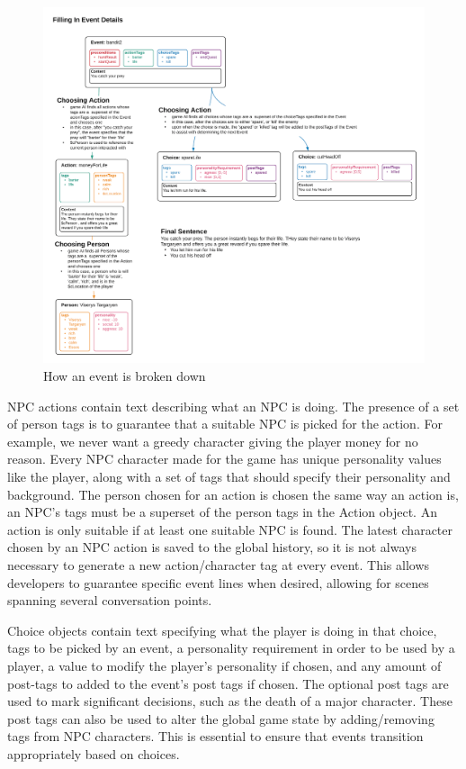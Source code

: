 \begin{figure}[ht]
    \centering
    \includegraphics[width=\textwidth]{images/eventFill.png}
    \caption{How an event is broken down}
    \label{fig:eventFill}
\end{figure}

NPC actions contain text describing what an NPC is doing. The presence of a set of person tags is to guarantee that a suitable NPC is picked for the action. For example, we never want a greedy character giving the player money for no reason. Every NPC character made for the game has unique personality values like the player, along with a set of tags that should specify their personality and background. The person chosen for an action is chosen the same way an action is, an NPC's tags must be a superset of the person tags in the Action object. An action is only suitable if at least one suitable NPC is found. The latest character chosen by an NPC action is saved to the global history, so it is not always necessary to generate a new action/character tag at every event. This allows developers to guarantee specific event lines when desired, allowing for scenes spanning several conversation points.

Choice objects contain text specifying what the player is doing in that choice, tags to be picked by an event, a personality requirement in order to be used by a player, a value to modify the player's personality if chosen, and any amount of post-tags to added to the event's post tags if chosen. The optional post tags are used to mark significant decisions, such as the death of a major character. These post tags can also be used to alter the global game state by adding/removing tags from NPC characters. This is essential to ensure that events transition appropriately based on choices.

